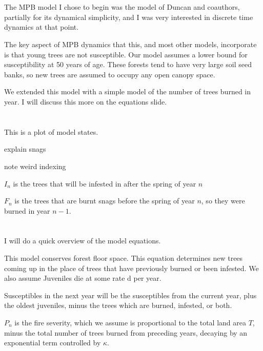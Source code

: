 \documentclass{article}
\begin{document}
\section{}

The MPB model I chose to begin was the model of Duncan and coauthors, partially for its dynamical simplicity, and I was very interested in discrete time dynamics at that point.

The key aspect of MPB dynamics that this, and most other models, incorporate is that young trees are not susceptible. Our model assumes a lower bound for susceptibility at 50 years of age. These forests tend to have very large soil seed banks, so new trees are assumed to occupy any open canopy space.  

We extended this model with a simple model of the number of trees burned in year. I will discuss this more on the equations slide.
\section{}

This is a plot of model states.

explain snags

note weird indexing

$I_n$ is the trees that will be infested in after the spring of year $n$

$F_n$ is the trees that are burnt snags before the spring of year $n$, so they were burned in year $n-1$.




\section{}

I will do a quick overview of the model equations.

This model conserves forest floor space. This equation determines new trees coming up in the place of trees that have previously burned or been infested. We also assume Juveniles die at some rate d per year. 

Susceptibles in the next year will be the susceptibles from the current year, plus the oldest juveniles, minus the trees which are burned, infested, or both.


$P_n$ is the fire severity, which we assume is proportional to the total land area $T$, minus the total number of trees burned from preceding years, decaying by an exponential term controlled by $\kappa$.
\end{document}
